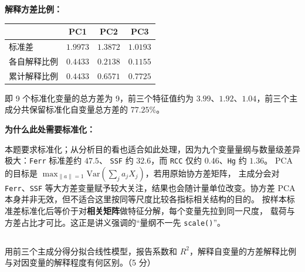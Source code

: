 \documentclass[12pt,a4paper]{article}
\begin{document}
\begin{answerbox}
\textbf{解释方差比例：}
\begin{center}
\small
\begin{tabular}{lccc}
\toprule
 & PC1 & PC2 & PC3 \\
\midrule
标准差 & $1.9973$ & $1.3872$ & $1.0193$ \\
各自解释比例 & $0.4433$ & $0.2138$ & $0.1155$ \\
累计解释比例 & $0.4433$ & $0.6571$ & $0.7725$ \\
\bottomrule
\end{tabular}
\end{center}
即 9 个标准化变量的总方差为 9，前三个特征值约为 $3.99$、$1.92$、$1.04$，前三个主成分共保留标准化自变量总方差的 $77.25\%$。

\textbf{为什么此处需要标准化：}

本题要求标准化；从分析目的看也适合如此处理，因为九个变量量纲与数量级差异极大：\texttt{Ferr} 标准差约 $47.5$、
\texttt{SSF} 约 $32.6$，而 \texttt{RCC} 仅约 $0.46$、\texttt{Hg} 约 $1.36$。
PCA 的目标是 $\max_{\lVert a\rVert=1}\mathrm{Var}(\sum_j a_j X_j)$，若用原始协方差矩阵，
主成分会对 \texttt{Ferr}、\texttt{SSF} 等大方差变量赋予较大关注，结果也会随计量单位改变。协方差 PCA 本身并非无效，但不适合这里按同等尺度比较各指标相关结构的目的。
按样本标准差标准化后等价于对\textbf{相关矩阵}做特征分解，每个变量先拉到同一尺度，
载荷与方差占比才可比。这正是讲义强调的``量纲不一先 \texttt{scale()}''。

\end{answerbox}

\subsection{}

用前三个主成分得分拟合线性模型，报告系数和 $R^2$，解释自变量的方差解释比例与对因变量的解释程度有何区别。（5 分）
\end{document}
